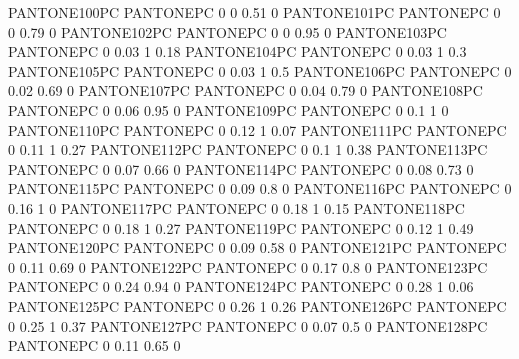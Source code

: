  {PANTONE100PC} {PANTONE\SpotSpace PC} {0 0 0.51 0}
 {PANTONE101PC} {PANTONE\SpotSpace PC} {0 0 0.79 0}
 {PANTONE102PC} {PANTONE\SpotSpace PC} {0 0 0.95 0}
 {PANTONE103PC} {PANTONE\SpotSpace PC} {0 0.03 1 0.18}
 {PANTONE104PC} {PANTONE\SpotSpace PC} {0 0.03 1 0.3}
 {PANTONE105PC} {PANTONE\SpotSpace PC} {0 0.03 1 0.5}
 {PANTONE106PC} {PANTONE\SpotSpace PC} {0 0.02 0.69 0}
 {PANTONE107PC} {PANTONE\SpotSpace PC} {0 0.04 0.79 0}
 {PANTONE108PC} {PANTONE\SpotSpace PC} {0 0.06 0.95 0}
 {PANTONE109PC} {PANTONE\SpotSpace PC} {0 0.1 1 0}
 {PANTONE110PC} {PANTONE\SpotSpace PC} {0 0.12 1 0.07}
 {PANTONE111PC} {PANTONE\SpotSpace PC} {0 0.11 1 0.27}
 {PANTONE112PC} {PANTONE\SpotSpace PC} {0 0.1 1 0.38}
 {PANTONE113PC} {PANTONE\SpotSpace PC} {0 0.07 0.66 0}
 {PANTONE114PC} {PANTONE\SpotSpace PC} {0 0.08 0.73 0}
 {PANTONE115PC} {PANTONE\SpotSpace PC} {0 0.09 0.8 0}
 {PANTONE116PC} {PANTONE\SpotSpace PC} {0 0.16 1 0}
 {PANTONE117PC} {PANTONE\SpotSpace PC} {0 0.18 1 0.15}
 {PANTONE118PC} {PANTONE\SpotSpace PC} {0 0.18 1 0.27}
 {PANTONE119PC} {PANTONE\SpotSpace PC} {0 0.12 1 0.49}
 {PANTONE120PC} {PANTONE\SpotSpace PC} {0 0.09 0.58 0}
 {PANTONE121PC} {PANTONE\SpotSpace PC} {0 0.11 0.69 0}
 {PANTONE122PC} {PANTONE\SpotSpace PC} {0 0.17 0.8 0}
 {PANTONE123PC} {PANTONE\SpotSpace PC} {0 0.24 0.94 0}
 {PANTONE124PC} {PANTONE\SpotSpace PC} {0 0.28 1 0.06}
 {PANTONE125PC} {PANTONE\SpotSpace PC} {0 0.26 1 0.26}
 {PANTONE126PC} {PANTONE\SpotSpace PC} {0 0.25 1 0.37}
 {PANTONE127PC} {PANTONE\SpotSpace PC} {0 0.07 0.5 0}
 {PANTONE128PC} {PANTONE\SpotSpace PC} {0 0.11 0.65 0}
